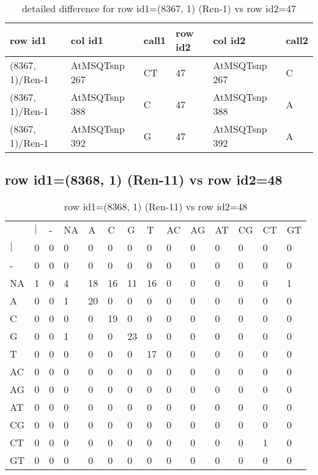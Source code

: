\begin{center}
\begin{longtable}{|l|l|l|l|l|l|}
\caption{detailed difference for row id1=(8367, 1) (Ren-1) vs row id2=47} \label{table_dm593}\\
\hline
row id1&col id1&call1&row id2&col id2&call2\\
\hline
(8367, 1)/Ren-1&AtMSQTsnp 267&CT&47&AtMSQTsnp 267&C\\
(8367, 1)/Ren-1&AtMSQTsnp 388&C&47&AtMSQTsnp 388&A\\
(8367, 1)/Ren-1&AtMSQTsnp 392&G&47&AtMSQTsnp 392&A\\
\hline
\end{longtable}
\end{center}

\subsection{row id1=(8368, 1) (Ren-11) vs row id2=48}
\begin{center}
\begin{longtable}{|l|l|l|l|l|l|l|l|l|l|l|l|l|l|}
\caption{row id1=(8368, 1) (Ren-11) vs row id2=48} \label{table_dm594}\\
\hline
\\
\hline
&$|$&-&NA&A&C&G&T&AC&AG&AT&CG&CT&GT\\
$|$&0&0&0&0&0&0&0&0&0&0&0&0&0\\
-&0&0&0&0&0&0&0&0&0&0&0&0&0\\
NA&1&0&4&18&16&11&16&0&0&0&0&0&1\\
A&0&0&1&20&0&0&0&0&0&0&0&0&0\\
C&0&0&0&0&19&0&0&0&0&0&0&0&0\\
G&0&0&1&0&0&23&0&0&0&0&0&0&0\\
T&0&0&0&0&0&0&17&0&0&0&0&0&0\\
AC&0&0&0&0&0&0&0&0&0&0&0&0&0\\
AG&0&0&0&0&0&0&0&0&0&0&0&0&0\\
AT&0&0&0&0&0&0&0&0&0&0&0&0&0\\
CG&0&0&0&0&0&0&0&0&0&0&0&0&0\\
CT&0&0&0&0&0&0&0&0&0&0&0&1&0\\
GT&0&0&0&0&0&0&0&0&0&0&0&0&0\\
\hline
\end{longtable}
\end{center}

